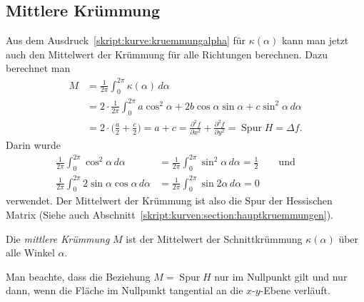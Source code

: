 \subsection{Mittlere Krümmung%
\label{skript:kurve:mittlerekruemmung}}
Aus dem Ausdruck~\eqref{skript:kurve:kruemmungalpha}
für $\kappa(\alpha)$ kann man jetzt auch den Mittelwert
der Krümmung für alle Richtungen berechnen.
Dazu berechnet man
\begin{align*}
M
&=
\frac{1}{2\pi}\int_0^{2\pi} \kappa(\alpha)\,d\alpha
\\
&=
2\cdot
\frac{1}{2\pi}\int_0^{2\pi}
a\cos^2\alpha + 2b\cos\alpha\sin\alpha + c\sin^2 \alpha
\,d\alpha
\\
&=
2\cdot\biggl( \frac{a}2 + \frac{c}2\biggr)
=
a+c
=
\frac{\partial^2 f}{\partial x^2}
+
\frac{\partial^2 f}{\partial y^2}
=
\operatorname{Spur}H
=
\Delta f.
\end{align*}
Darin wurde
\begin{align*}
\frac1{2\pi}\int_0^{2\pi}\cos^2\alpha\,d\alpha
&=
\frac1{2\pi}\int_0^{2\pi}\sin^2\alpha\,d\alpha
=
\frac12
\qquad\text{und}\qquad
\\
\frac{1}{2\pi}\int_0^{2\pi}2\sin\alpha\cos\alpha\,d\alpha
&=
\frac{1}{2\pi}\int_0^{2\pi}\sin2\alpha\,d\alpha
=
0
\end{align*}
verwendet.
Der Mittelwert der Krümmung ist also die Spur der Hessischen Matrix
(Siehe auch Abschnitt~\ref{skript:kurven:section:hauptkruemmungen}).

\begin{definition}
\label{skript:definition:mittlerekruemmung}
Die {\em mittlere Krümmung} $M$ ist der Mittelwert der Schnittkrümmung
$\kappa(\alpha)$ über alle Winkel $\alpha$.
\end{definition}

Man beachte, dass die Beziehung $M=\operatorname{Spur}H$ nur 
im Nullpunkt gilt und nur dann, wenn die Fläche im Nullpunkt tangential
an die $x$-$y$-Ebene verläuft.




